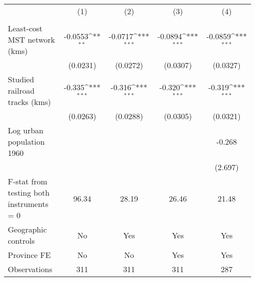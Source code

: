 {
\def\sym#1{\ifmmode^{#1}\else\(^{#1}\)\fi}
\begin{tabular}{l*{4}{c}}
\hline\hline
                &\multicolumn{1}{c}{(1)}&\multicolumn{1}{c}{(2)}&\multicolumn{1}{c}{(3)}&\multicolumn{1}{c}{(4)}\\
                &\multicolumn{1}{c}{}&\multicolumn{1}{c}{}&\multicolumn{1}{c}{}&\multicolumn{1}{c}{}\\
\hline
Least-cost MST network (kms)&  -0.0553\sym{**} &  -0.0717\sym{***}&  -0.0894\sym{***}&  -0.0859\sym{***}\\
                & (0.0231)         & (0.0272)         & (0.0307)         & (0.0327)         \\
[1em]
Studied railroad tracks (kms)&   -0.335\sym{***}&   -0.316\sym{***}&   -0.320\sym{***}&   -0.319\sym{***}\\
                & (0.0263)         & (0.0288)         & (0.0305)         & (0.0321)         \\
[1em]
Log urban population 1960&                  &                  &                  &   -0.268         \\
                &                  &                  &                  &  (2.697)         \\
\hline
F-stat from testing both instruments = 0&    96.34         &    28.19         &    26.46         &    21.48         \\
Geographic controls&       No         &      Yes         &      Yes         &      Yes         \\
Province FE     &       No         &       No         &      Yes         &      Yes         \\
Observations    &      311         &      311         &      311         &      287         \\
\hline\hline
\end{tabular}
}
